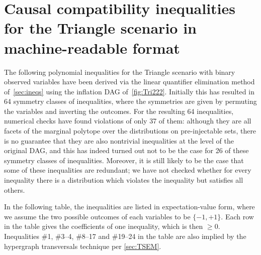 {%
\section{Causal compatibility inequalities for the Triangle scenario in machine-readable format}
\label{sec:38ineqs}

The following polynomial inequalities for the Triangle scenario with binary observed variables have been derived via the linear quantifier elimination method of~\cref{sec:ineqs} using the inflation DAG of~\cref{fig:Tri222}. Initially this has resulted in 64 symmetry classes of inequalities, where the symmetries are given by permuting the variables and inverting the outcomes. For the resulting 64 inequalities, numerical checks have found violations of only 37 of them: although they are all facets of the marginal polytope over the distributions on pre-injectable sets, there is no guarantee that they are also nontrivial inequalities at the level of the original DAG, and this has indeed turned out not to be the case for 26 of these symmetry classes of inequalities. Moreover, it is still likely to be the case that some of these inequalities are redundant; we have not checked whether for every inequality there is a distribution which violates the inequality but satisfies all others.

In the following table, the inequalities are listed in expectation-value form, where we assume the two possible outcomes of each variables to be $\{-1,+1\}$. Each row in the table gives the coefficients of one inequality, which is then $\geq 0$. Inequalities \#1, \#3--4, \#8--17 and \#19--24 in the table are also implied by the hypergraph transversals technique per \cref{sec:TSEM}.

}
